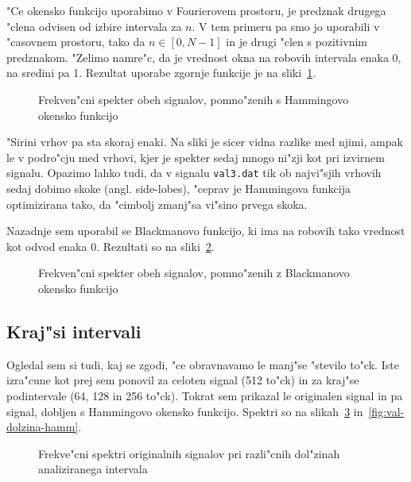 \documentclass[a4paper,10pt]{article}
\begin{document}
"Ce okensko funkcijo uporabimo v Fourierovem prostoru, je predznak drugega "clena odvisen od izbire intervala za $n$. V tem primeru pa smo jo uporabili v "casovnem prostoru, tako da $n \in [0,N-1]$ in je drugi "clen s pozitivnim predznakom. "Zelimo namre"c, da je vrednost okna na robovih intervala enaka 0, na sredini pa 1.  Rezultat uporabe zgornje funkcije je na sliki~\ref{fig:val-hamm}. 

\begin{figure}[h]
 
\caption{Frekven"cni spekter obeh signalov, pomno"zenih s Hammingovo okensko funkcijo}
\label{fig:val-hamm}
\end{figure}

"Sirini vrhov pa sta skoraj enaki. Na sliki je sicer vidna razlike med njimi, ampak le v podro"cju med vrhovi, kjer je spekter sedaj mnogo ni"zji kot pri izvirnem signalu. Opazimo lahko tudi, da v signalu \texttt{val3.dat} tik ob najvi"sjih vrhovih sedaj dobimo skoke (angl. side-lobes), "ceprav je Hammingova funkcija optimizirana tako, da "cimbolj zmanj"sa vi"sino prvega skoka. 

Nazadnje sem uporabil se Blackmanovo funkcijo, ki ima na robovih tako vrednost kot odvod enaka 0. Rezultati so na sliki~\ref{fig:val-black}. 

\begin{figure}[h]
 
\caption{Frekven"cni spekter obeh signalov, pomno"zenih z Blackmanovo okensko funkcijo}
\label{fig:val-black}
\end{figure}

\cleardoublepage
\subsection{Kraj"si intervali}

Ogledal sem si tudi, kaj se zgodi, "ce obravnavamo le manj"se "stevilo to"ck. Iste izra"cune kot prej sem ponovil za celoten signal (512 to"ck) in za kraj"se podintervale (64, 128 in 256 to"ck). Tokrat sem prikazal le originalen signal in pa signal, dobljen s Hammingovo okensko funkcijo. Spektri so na slikah~\ref{fig:val-dolzina} in~\ref{fig:val-dolzina-hamm}. 

\begin{figure}[h]
 \subfigure[$M = 64$]{\label{fig:val-dolzina-64}} 
 \subfigure[$M = 128$]{}
 \subfigure[$M = 256$]{}
 \subfigure[$M = 512$]{}
\caption{Frekve"cni spektri originalnih signalov pri razli"cnih dol"zinah analiziranega intervala}
\label{fig:val-dolzina}
\end{figure}
\end{document}
